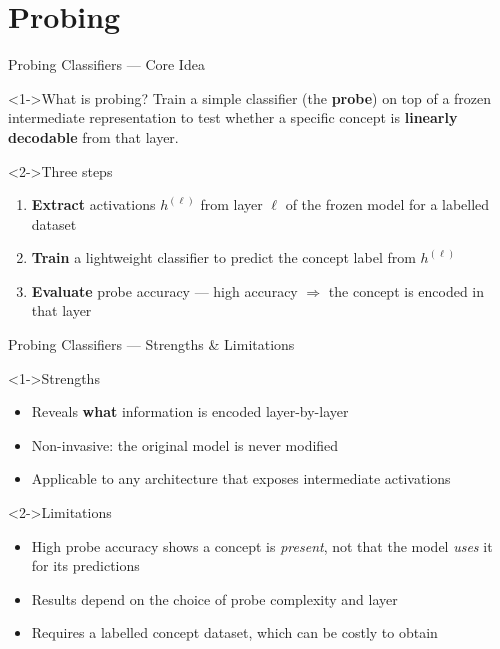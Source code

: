 \documentclass[aspectratio=169]{beamer}
\newcommand{\highlight}[1]{\textcolor{xaiaccent}{\textbf{#1}}}
\begin{document}
\section{Probing}

\begin{frame}{Probing Classifiers --- Core Idea}
  \begin{block}<1->{What is probing?}
    Train a simple classifier (the \textbf{probe}) on top of a frozen
    intermediate representation to test whether a specific concept is
    \highlight{linearly decodable} from that layer.
  \end{block}
  \vspace{0.4em}
  \begin{block}<2->{Three steps}
    \begin{enumerate}
      \item \textbf{Extract} activations $h^{(\ell)}$ from layer $\ell$ of the
            frozen model for a labelled dataset
      \item \textbf{Train} a lightweight classifier to predict the concept label from $h^{(\ell)}$
      \item \textbf{Evaluate} probe accuracy --- high accuracy $\Rightarrow$
            the concept is encoded in that layer
    \end{enumerate}
  \end{block}
\end{frame}

\begin{frame}{Probing Classifiers --- Strengths \& Limitations}
  \begin{exampleblock}<1->{Strengths}
    \begin{itemize}
      \item Reveals \textbf{what} information is encoded layer-by-layer
      \item Non-invasive: the original model is never modified
      \item Applicable to any architecture that exposes intermediate activations
    \end{itemize}
  \end{exampleblock}
  \vspace{0.4em}
  \begin{alertblock}<2->{Limitations}
    \begin{itemize}
      \item High probe accuracy shows a concept is \emph{present}, not that
            the model \emph{uses} it for its predictions
      \item Results depend on the choice of probe complexity and layer
      \item Requires a labelled concept dataset, which can be costly to obtain
    \end{itemize}
  \end{alertblock}
\end{frame}
\end{document}
